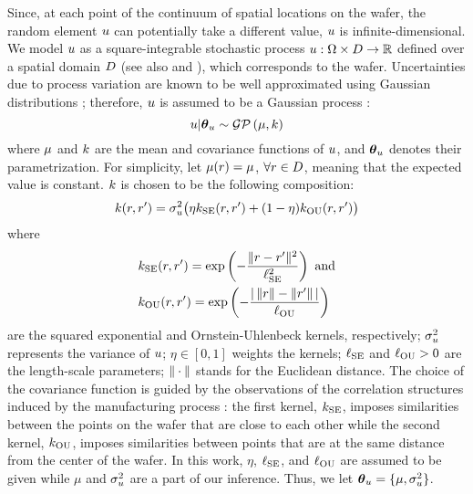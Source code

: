 Since, at each point of the continuum of spatial locations on the wafer, the random element $u$ can potentially take a different value, $u$ is infinite-dimensional.
We model $u$ as a square-integrable stochastic process $u: \Omega \times D \to \mathbb{R}$ defined over a spatial domain $D$ (see also  and \cite{durrett2010}), which corresponds to the wafer.
Uncertainties due to process variation are known to be well approximated using Gaussian distributions \cite{srivastava2010}; therefore, $u$ is assumed to be a Gaussian process \cite{rasmussen2006}:
\[
  \u | \vparam_\u \sim \gaussianp{\fMean}{\fCov}
\]
where $\fMean$ and $\fCov$ are the mean and covariance functions of $u$, and ${\boldsymbol\theta}_u$ denotes their parametrization. For simplicity, let $\fMean{\r} = \mu$, $\forall r \in D$, meaning that the expected value is constant.
$\fCov$ is chosen to be the following composition:
\begin{equation} \elabel{covariance-function}
  \fCov{\r, \r'} = \sigma_\u^2 \big( \eta \fCov_\SE(\r, \r') + (1 - \eta) \fCov_\OU(\r, \r') \big)
\end{equation}
where
\begin{align*}
  & \fCov_\SE(\r, \r') = \exp\left(-\frac{\norm{\r - \r'}^2}{\ell_\SE^2}\right) \text{ and} \\
  & \fCov_\OU(\r, \r') = \exp\left(- \frac{\abs{\,\norm{\r} - \norm{\r'}\,}}{\ell_\OU} \right)
\end{align*}
are the squared exponential and Ornstein-Uhlenbeck kernels, respectively; $\sigma_u^2$ represents the variance of $u$; $\eta \in [0, 1]$ weights the kernels; $\ell_{\text{SE}}$ and $\ell_{\text{OU}} > 0$ are the length-scale parameters; $\| \cdot \|$ stands for the Euclidean distance.
The choice of the covariance function is guided by the observations of the correlation structures induced by the manufacturing process \cite{cheng2011}: the first kernel, $\fCov_\SE$, imposes similarities between the points on the wafer that are close to each other while the second kernel, $\fCov_\OU$, imposes similarities between points that are at the same distance from the center of the wafer.
In this work, $\eta$, $\ell_{\text{SE}}$, and $\ell_{\text{OU}}$ are assumed to be given while $\mu$ and $\sigma^2_u$ are a part of our inference. Thus, we let ${\boldsymbol\theta}_u = \{ \mu, \sigma_u^2 \}$.

